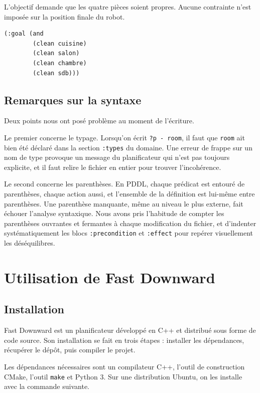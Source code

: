 \documentclass[a4paper, 11pt]{report}
\begin{document}
	L'objectif demande que les quatre pièces soient propres. Aucune contrainte
	n'est imposée sur la position finale du robot.
	
	\begin{lstlisting}[style=pddl, caption={Objectif.}]
		(:goal (and
		(clean cuisine)
		(clean salon)
		(clean chambre)
		(clean sdb)))
	\end{lstlisting}
	
	\subsection{Remarques sur la syntaxe}
	
	Deux points nous ont posé problème au moment de l'écriture.
	
	Le premier concerne le typage. Lorsqu'on écrit \texttt{?p - room}, il faut
	que \texttt{room} ait bien été déclaré dans la section \texttt{:types} du
	domaine. Une erreur de frappe sur un nom de type provoque un message du
	planificateur qui n'est pas toujours explicite, et il faut relire le
	fichier en entier pour trouver l'incohérence.
	
	Le second concerne les parenthèses. En PDDL, chaque prédicat est entouré de
	parenthèses, chaque action aussi, et l'ensemble de la définition est
	lui-même entre parenthèses. Une parenthèse manquante, même au niveau le
	plus externe, fait échouer l'analyse syntaxique. Nous avons pris l'habitude
	de compter les parenthèses ouvrantes et fermantes à chaque modification du
	fichier, et d'indenter systématiquement les blocs \texttt{:precondition} et
	\texttt{:effect} pour repérer visuellement les déséquilibres.
	
	\section{Utilisation de Fast Downward}
	
	\subsection{Installation}
	
	Fast Downward est un planificateur développé en C++ et distribué sous forme
	de code source. Son installation se fait en trois étapes : installer les
	dépendances, récupérer le dépôt, puis compiler le projet.
	
	Les dépendances nécessaires sont un compilateur C++, l'outil de
	construction CMake, l'outil \texttt{make} et Python 3. Sur une distribution
	Ubuntu, on les installe avec la commande suivante.
	
\end{document}
